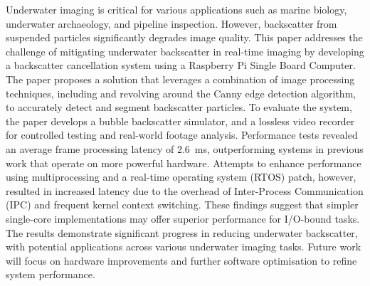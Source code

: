 Underwater imaging is critical for various applications such as marine biology, underwater archaeology, and pipeline inspection. However, backscatter from suspended particles significantly degrades image quality. This paper addresses the challenge of mitigating underwater backscatter in real-time imaging by developing a backscatter cancellation system using a Raspberry Pi Single Board Computer. The paper proposes a solution that leverages a combination of image processing techniques, including and revolving around the Canny edge detection algorithm, to accurately detect and segment backscatter particles. To evaluate the system, the paper develops a bubble backscatter simulator, and a lossless video recorder for controlled testing and real-world footage analysis. Performance tests revealed an average frame processing latency of \SI{2.6}{\milli\second}, outperforming systems in previous work that operate on more powerful hardware. Attempts to enhance performance using multiprocessing and a real-time operating system (RTOS) patch, however, resulted in increased latency due to the overhead of Inter-Process Communication (IPC) and frequent kernel context switching. These findings suggest that simpler single-core implementations may offer superior performance for I/O-bound tasks. The results demonstrate significant progress in reducing underwater backscatter, with potential applications across various underwater imaging tasks. Future work will focus on hardware improvements and further software optimisation to refine system performance.
